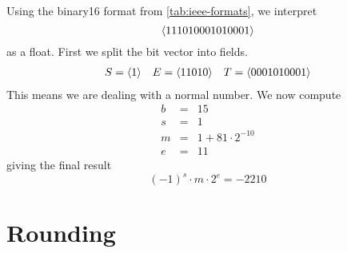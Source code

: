 \begin{example}
  Using the binary16 format from \cref{tab:ieee-formats}, we interpret
  \[
    \langle 111010001010001 \rangle
  \]
  as a float.  First we split the bit vector into fields.
  \[
    \begin{array}{lll}
      S=\langle 1 \rangle & E=\langle 11010 \rangle & T=\langle 0001010001 \rangle
    \end{array}
  \]
  This means we are dealing with a normal number.  We now compute
  \[
    \begin{array}{ccr}
      b &=& 15 \\
      s &=& 1 \\
      m &=& 1 + 81 \cdot 2^{-10} \\
      e &=& 11
    \end{array}
  \]
  giving the final result
  \[
    (-1)^{s} \cdot m \cdot 2^{e} = -2210
  \]
\end{example}

\section{Rounding}
\label{sec:rounding}

